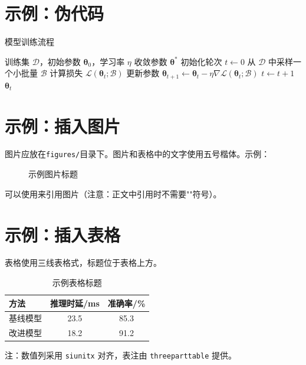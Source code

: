 \section{示例：伪代码}

\begin{algorithm}[H]
    \caption{模型训练流程}
    \label{alg:training}
    \begin{algorithmic}[1]
        \Require 训练集 $\mathcal{D}$，初始参数 $\bm{\theta}_{0}$，学习率 $\eta$
        \Ensure 收敛参数 $\bm{\theta}^{*}$
        \State 初始化轮次 $t \gets 0$
            \State 从 $\mathcal{D}$ 中采样一个小批量 $\mathcal{B}$
            \State 计算损失 $\mathcal{L}(\bm{\theta}_{t}; \mathcal{B})$
            \State 更新参数 $\bm{\theta}_{t+1} \gets \bm{\theta}_{t} - \eta \nabla \mathcal{L}(\bm{\theta}_{t}; \mathcal{B})$
            \State $t \gets t + 1$
        \EndWhile
        \State \Return $\bm{\theta}_{t}$
    \end{algorithmic}
\end{algorithm}

\section{示例：插入图片}

图片应放在\texttt{figures/}目录下。图片和表格中的文字使用五号楷体。示例：

\begin{figure}[H]
    \centering
    \caption{示例图片标题}
    \label{fig:example}
\end{figure}

可以使用来引用图片（注意：正文中引用时不需要"\texttt{}"符号）。

\section{示例：插入表格}

表格使用三线表格式，标题位于表格上方。

\begin{table}[H]
    \centering
    \caption{示例表格标题}
    \label{tab:example}
    \begin{threeparttable}
        \begin{tabular}{lSS}
            \toprule
            方法 & {推理时延/\si{\milli\second}} & {准确率/\si{\percent}} \\
            \midrule
            基线模型 & 23.5 & 85.3 \\
            改进模型 & 18.2 & 91.2 \\
            \bottomrule
        \end{tabular}
        \begin{tablenotes}[flushleft]
            \item 注：数值列采用 \texttt{siunitx} 对齐，表注由 \texttt{threeparttable} 提供。
        \end{tablenotes}
    \end{threeparttable}
\end{table}

